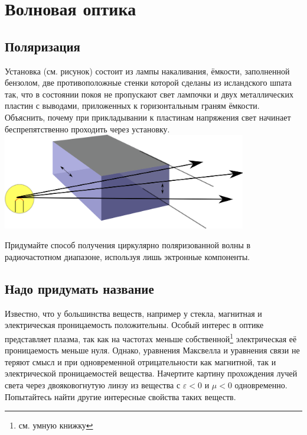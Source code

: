 \chapter{Волновая оптика}
\thispagestyle{empty}
\clearpage
\section{Поляризация}
\begin{problem}
Установка (см. рисунок) состоит из лампы накаливания, ёмкости, заполненной бензолом, две противоположные стенки которой сделаны из исландского шпата так, что в состоянии покоя не пропускают свет лампочки и двух металлических пластин с выводами, приложенных к горизонтальным граням ёмкости. Объяснить, почему при прикладывании к пластинам напряжения свет начинает беспрепятственно проходить через установку.
{\includegraphics[width=0.8\textwidth]{./kerr}}
\end{problem}
\begin{problem}
Придумайте способ получения циркулярно поляризованной волны в радиочастотном диапазоне, используя лишь эктронные компоненты.
\end{problem}
\section{Надо придумать название}
\begin{problem}
Известно, что у большинства веществ, например у стекла, магнитная и электрическая проницаемость положительны. Особый интерес в оптике представляет плазма, так как на частотах меньше собственной\footnote{см. умную книжку} электрическая её проницаемость меньше нуля. Однако, уравнения Максвелла и уравнения связи не теряют смысл и при одновременной отрицательности как магнитной, так и электрической проницаемостей вещества. Начертите картину прохождения лучей света через двояковогнутую линзу из вещества с $\varepsilon<0$ и $\mu<0$ одновременно. Попытайтесь найти другие интересные свойства таких веществ.
\end{problem}